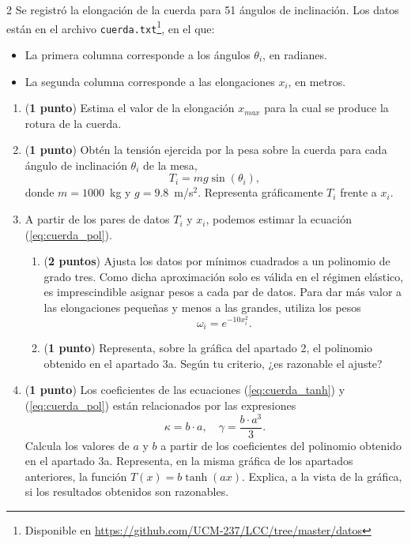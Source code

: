 \begin{paracol}{2}
Se registró la elongación de la cuerda para 51 ángulos de inclinación. Los datos están en el archivo \texttt{cuerda.txt}\footnote{Disponible en \url{https://github.com/UCM-237/LCC/tree/master/datos}}, en el que:
\begin{itemize}
	\item La primera columna corresponde a los ángulos $\theta_i$, en radianes.
	\item La segunda columna corresponde a las elongaciones $x_i$, en metros.
\end{itemize}

\begin{enumerate}
\item (\textbf{1 punto}) Estima el valor de la elongación $x_{max}$ para la cual se produce la rotura de la cuerda.

\item (\textbf{1 punto}) Obtén la tensión ejercida por la pesa sobre la cuerda para cada ángulo de inclinación $\theta_i$ de la mesa,
\begin{equation*}
T_i = mg\sin(\theta_i),
\end{equation*}
donde $m =1000$~kg y $g = 9.8$~m/s$^2$. Representa gráficamente $T_i$ frente a $x_i$.

\item A partir de los pares de datos $T_i$ y $x_i$, podemos estimar la ecuación (\ref{eq:cuerda_pol}).
\begin{enumerate}
\item (\textbf{2 puntos}) Ajusta los datos por mínimos cuadrados a un polinomio de grado tres. Como dicha aproximación solo es válida en el régimen elástico, es imprescindible asignar pesos a cada par de datos. Para dar más valor a las elongaciones pequeñas y menos a las grandes, utiliza los pesos
\begin{equation*}
\omega_i = e^{-10x_i^2}.
\end{equation*}
\item (\textbf{1 punto}) Representa, sobre la gráfica del apartado 2, el polinomio obtenido en el apartado 3a. Según tu criterio, ¿es razonable el ajuste?
\end{enumerate}

\item (\textbf{1 punto}) Los coeficientes de las ecuaciones (\ref{eq:cuerda_tanh}) y (\ref{eq:cuerda_pol}) están relacionados por las expresiones
\begin{equation*}
\kappa = b\cdot a, \quad \gamma = \frac{b\cdot a^3}{3}.
\end{equation*}
Calcula los valores de $a$ y $b$ a partir de los coeficientes del polinomio obtenido en el apartado 3a. Representa, en la misma gráfica de los apartados anteriores, la función $T(x) = b\tanh(ax)$. Explica, a la vista de la gráfica, si los resultados obtenidos son razonables.


\end{enumerate}
\end{paracol}
